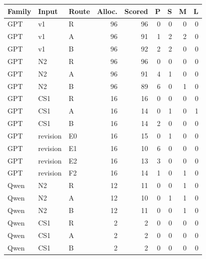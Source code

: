 \begin{tabular}{lllrrrrrr}
\toprule
Family & Input & Route & Alloc. & Scored & P & S & M & L \\
\midrule
GPT & v1 & R & 96 & 96 & 0 & 0 & 0 & 0 \\
GPT & v1 & A & 96 & 91 & 1 & 2 & 2 & 0 \\
GPT & v1 & B & 96 & 92 & 2 & 2 & 0 & 0 \\
GPT & N2 & R & 96 & 96 & 0 & 0 & 0 & 0 \\
GPT & N2 & A & 96 & 91 & 4 & 1 & 0 & 0 \\
GPT & N2 & B & 96 & 89 & 6 & 0 & 1 & 0 \\
GPT & CS1 & R & 16 & 16 & 0 & 0 & 0 & 0 \\
GPT & CS1 & A & 16 & 14 & 0 & 1 & 0 & 1 \\
GPT & CS1 & B & 16 & 14 & 2 & 0 & 0 & 0 \\
GPT & revision & E0 & 16 & 15 & 0 & 1 & 0 & 0 \\
GPT & revision & E1 & 16 & 10 & 6 & 0 & 0 & 0 \\
GPT & revision & E2 & 16 & 13 & 3 & 0 & 0 & 0 \\
GPT & revision & F2 & 16 & 14 & 1 & 0 & 1 & 0 \\
Qwen & N2 & R & 12 & 11 & 0 & 0 & 1 & 0 \\
Qwen & N2 & A & 12 & 10 & 0 & 1 & 1 & 0 \\
Qwen & N2 & B & 12 & 11 & 0 & 0 & 1 & 0 \\
Qwen & CS1 & R & 2 & 2 & 0 & 0 & 0 & 0 \\
Qwen & CS1 & A & 2 & 2 & 0 & 0 & 0 & 0 \\
Qwen & CS1 & B & 2 & 2 & 0 & 0 & 0 & 0 \\
\bottomrule
\end{tabular}
